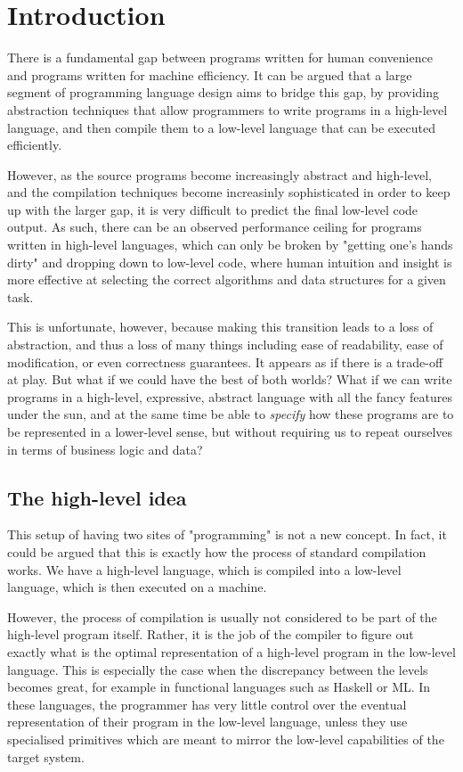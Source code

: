 \section{Introduction}\label{sec:intro}

There is a fundamental gap between programs written for human convenience and
programs written for machine efficiency. It can be argued that a large segment
of programming language design aims to bridge this gap, by providing
abstraction techniques that allow programmers to write programs in a high-level
language, and then compile them to a low-level language that can be executed
efficiently.

However, as the source programs become increasingly abstract and high-level,
and the compilation techniques become increasinly sophisticated in order to
keep up with the larger gap, it is very difficult to predict the final
low-level code output. As such, there can be an observed performance ceiling
for programs written in high-level languages, which can only be broken by
"getting one's hands dirty" and dropping down to low-level code, where human
intuition and insight is more effective at selecting the correct algorithms and
data structures for a given task.

This is unfortunate, however, because making this transition leads to a loss of
abstraction, and thus a loss of many things including ease of readability, ease
of modification, or even correctness guarantees. It appears as if there is a
trade-off at play. But what if we could have the best of both worlds? What if
we can write programs in a high-level, expressive, abstract language with all
the fancy features under the sun, and at the same time be able to
\emph{specify} how these programs are to be represented in a lower-level sense,
but without requiring us to repeat ourselves in terms of business logic and
data?

\subsection{The high-level idea}

This setup of having two sites of "programming" is not a new concept. In fact,
it could be argued that this is exactly how the process of standard compilation
works. We have a high-level language, which is compiled into a low-level
language, which is then executed on a machine.

However, the process of compilation is usually not considered to be part of the
high-level program itself. Rather, it is the job of the compiler to figure out
exactly what is the optimal representation of a high-level program in the
low-level language. This is especially the case when the discrepancy between
the levels becomes great, for example in functional languages such as Haskell
or ML. In these languages, the programmer has very little control over the
eventual representation of their program in the low-level language, unless they
use specialised primitives which are meant to mirror the low-level capabilities
of the target system.


